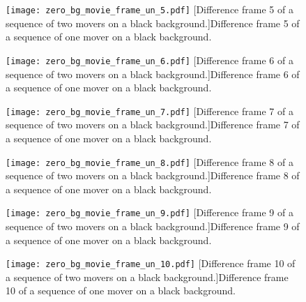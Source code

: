 \begin{figure}[!ht]
	\centering
	\texttt{[image: zero\_bg\_movie\_frame\_un\_5.pdf]}
	[Difference frame 5 of a sequence of two movers on a black background.]{Difference frame 5 of a sequence of one mover on a black background.}
	\label{fig:zero_bg_movie_frame_un_5}
\end{figure}

\clearpage

\begin{figure}[!ht]
	\centering
	\texttt{[image: zero\_bg\_movie\_frame\_un\_6.pdf]}
	[Difference frame 6 of a sequence of two movers on a black background.]{Difference frame 6 of a sequence of one mover on a black background.}
	\label{fig:zero_bg_movie_frame_un_6}
\end{figure}



\begin{figure}[!ht]
	\centering
	\texttt{[image: zero\_bg\_movie\_frame\_un\_7.pdf]}
	[Difference frame 7 of a sequence of two movers on a black background.]{Difference frame 7 of a sequence of one mover on a black background.}
	\label{fig:zero_bg_movie_frame_un_7}
\end{figure}

\begin{figure}[!ht]
	\centering
	\texttt{[image: zero\_bg\_movie\_frame\_un\_8.pdf]}
	[Difference frame 8 of a sequence of two movers on a black background.]{Difference frame 8 of a sequence of one mover on a black background.}
	\label{fig:zero_bg_movie_frame_un_8}
\end{figure}

\clearpage

\begin{figure}[!ht]
	\centering
	\texttt{[image: zero\_bg\_movie\_frame\_un\_9.pdf]}
	[Difference frame 9 of a sequence of two movers on a black background.]{Difference frame 9 of a sequence of one mover on a black background.}
	\label{fig:zero_bg_movie_frame_un_9}
\end{figure}

\begin{figure}[!ht]
	\centering
	\texttt{[image: zero\_bg\_movie\_frame\_un\_10.pdf]}
	[Difference frame 10 of a sequence of two movers on a black background.]{Difference frame 10 of a sequence of one mover on a black background.}
	\label{fig:zero_bg_movie_frame_un_10}
\end{figure}

